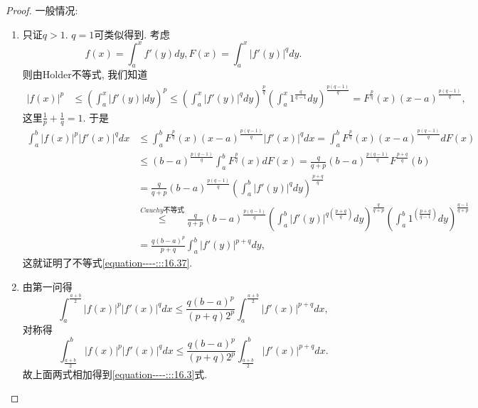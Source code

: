 \documentclass[../../main.tex]{subfiles}
\begin{document}
\begin{proof}
{\heiti 一般情况:}
\begin{enumerate}
\item 只证\(q>1\). \(q = 1\)可类似得到. 考虑
\[f(x)=\int_{a}^{x}f'(y)dy, F(x)=\int_{a}^{x}|f'(y)|^{q}dy.\]
则由Holder不等式, 我们知道
\begin{align*}
|f(x)|^{p}&\leqslant \left(\int_{a}^{x}|f'(y)|dy\right)^{p} \leqslant \left(\int_{a}^{x}|f'(y)|^{q}dy\right)^{\frac{p}{q}}\left(\int_{a}^{x}1^{\frac{q}{q - 1}}dy\right)^{\frac{p(q - 1)}{q}} = F^{\frac{p}{q}}(x)(x - a)^{\frac{p(q - 1)}{q}},
\end{align*}
这里\(\frac{1}{p}+\frac{1}{q}=1\).
于是
\begin{align*}
\int_{a}^{b}|f(x)|^{p}|f'(x)|^{q}dx &\leqslant \int_{a}^{b}F^{\frac{p}{q}}(x)(x - a)^{\frac{p(q - 1)}{q}}|f'(x)|^{q}dx = \int_{a}^{b}F^{\frac{p}{q}}(x)(x - a)^{\frac{p(q - 1)}{q}}dF(x)\\
&\leqslant (b - a)^{\frac{p(q - 1)}{q}}\int_{a}^{b}F^{\frac{p}{q}}(x)dF(x) = \frac{q}{q + p}(b - a)^{\frac{p(q - 1)}{q}}F^{\frac{p + q}{q}}(b)\\
&=\frac{q}{q + p}(b - a)^{\frac{p(q - 1)}{q}}\left(\int_{a}^{b}|f'(y)|^{q}dy\right)^{\frac{p + q}{q}}\\
&\stackrel{Cauchy\text{不等式}}{\leqslant} \frac{q}{q + p}(b - a)^{\frac{p(q - 1)}{q}}\left(\int_{a}^{b}|f'(y)|^{q(\frac{p + q}{q})}dy\right)^{\frac{q}{q + p}}\left(\int_{a}^{b}1^{(\frac{p + q}{q - 1})}dy\right)^{\frac{q - 1}{q + p}}\\
&=\frac{q(b - a)^{p}}{p + q}\int_{a}^{b}|f'(y)|^{p + q}dy,
\end{align*}
这就证明了不等式\eqref{equation----:::16.37}.

\item 由第一问得
\[\int_{a}^{\frac{a + b}{2}}|f(x)|^{p}|f'(x)|^{q}dx \leqslant \frac{q(b - a)^{p}}{(p + q)2^{p}}\int_{a}^{\frac{a + b}{2}}|f'(x)|^{p + q}dx,\]
对称得
\[\int_{\frac{a + b}{2}}^{b}|f(x)|^{p}|f'(x)|^{q}dx \leqslant \frac{q(b - a)^{p}}{(p + q)2^{p}}\int_{\frac{a + b}{2}}^{b}|f'(x)|^{p + q}dx.\] 
故上面两式相加得到\eqref{equation----:::16.3}式.
\end{enumerate}
\end{proof}
\end{document}
